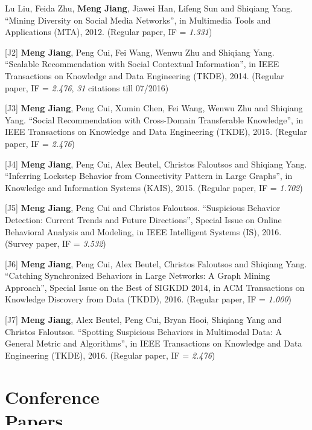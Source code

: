 \documentclass[margin, 10pt]{res} %
\begin{document}
\begin{resume}
[J1] Lu Liu, Feida Zhu, {\bf Meng Jiang}, Jiawei Han, Lifeng Sun and Shiqiang Yang. ``Mining Diversity on Social Media Networks'', in Multimedia Tools and Applications (MTA), 2012. (Regular paper, IF = {\em 1.331})

[J2] {\bf Meng Jiang}, Peng Cui, Fei Wang, Wenwu Zhu and Shiqiang Yang. ``Scalable Recommendation with Social Contextual Information'', in IEEE Transactions on Knowledge and Data Engineering (TKDE), 2014. (Regular paper, IF = {\em 2.476}, {\em 31} citations till 07/2016)

[J3] {\bf Meng Jiang}, Peng Cui, Xumin Chen, Fei Wang, Wenwu Zhu and Shiqiang Yang. ``Social Recommendation with Cross-Domain Transferable Knowledge'', in IEEE Transactions on Knowledge and Data Engineering (TKDE), 2015. (Regular paper, IF = {\em 2.476})

[J4] {\bf Meng Jiang}, Peng Cui, Alex Beutel, Christos Faloutsos and Shiqiang Yang. ``Inferring Lockstep Behavior from Connectivity Pattern in Large Graphs'', in Knowledge and Information Systems (KAIS), 2015. (Regular paper, IF = {\em 1.702})

[J5] {\bf Meng Jiang}, Peng Cui and Christos Faloutsos. ``Suspicious Behavior Detection: Current Trends and Future Directions'', Special Issue on Online Behavioral Analysis and Modeling, in IEEE Intelligent Systems (IS), 2016. (Survey paper, IF = {\em 3.532})

[J6] {\bf Meng Jiang}, Peng Cui, Alex Beutel, Christos Faloutsos and Shiqiang Yang. ``Catching Synchronized Behaviors in Large Networks: A Graph Mining Approach'', Special Issue on the Best of SIGKDD 2014, in ACM Transactions on Knowledge Discovery from Data (TKDD), 2016. (Regular paper, IF = {\em 1.000})

[J7] {\bf Meng Jiang}, Alex Beutel, Peng Cui, Bryan Hooi, Shiqiang Yang and Christos Faloutsos. ``Spotting Suspicious Behaviors in Multimodal Data: A General Metric and Algorithms'', in IEEE Transactions on Knowledge and Data Engineering (TKDE), 2016. (Regular paper, IF = {\em 2.476})


\section{Conference \\ Papers}


\end{resume}
\end{document}

